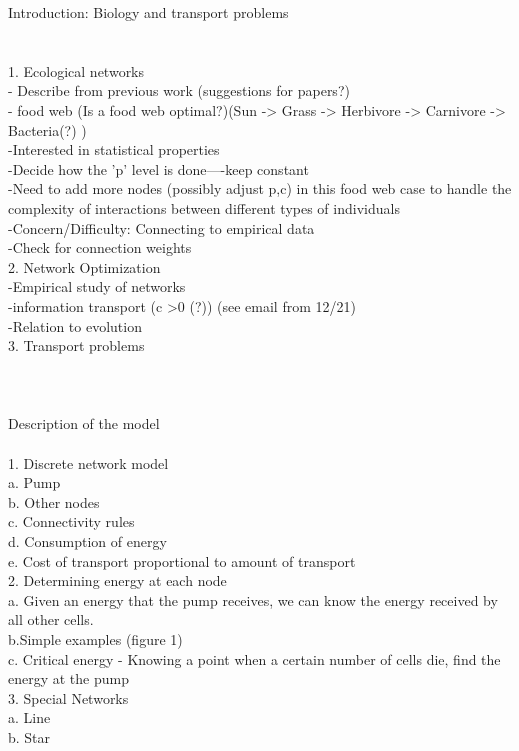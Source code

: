 \documentclass{amsart}
\theoremstyle{plain}
\numberwithin{equation}{section}
\begin{document}
Introduction: Biology and transport problems\\
\\
\\
1. Ecological networks\\
	- Describe from previous work (suggestions for papers?)\\
	- food web (Is a food web optimal?)(Sun -> Grass -> Herbivore -> Carnivore -> Bacteria(?) )\\
		-Interested in statistical properties\\
		-Decide how the 'p' level is done----keep constant\\
		-Need to add more nodes (possibly adjust p,c) in this food web case to handle the complexity of interactions between different types of individuals\\
		-Concern/Difficulty: Connecting to empirical data\\
		-Check for connection weights\\
2. Network Optimization\\
	-Empirical study of networks\\
		-information transport (c >0 (?)) (see email from 12/21)\\
		-Relation to evolution\\
3. Transport problems\\
\\
\\
\\
Description of the model\\
\\
1. Discrete network model\\
 a. Pump\\
 b. Other nodes\\
 c. Connectivity rules\\
 d. Consumption of energy\\
 e. Cost of transport proportional to amount of transport\\
2. Determining energy at each node\\
 a. Given an energy that the pump receives, we can know the energy received by all other cells.\\
 b.Simple examples (figure 1)\\
 c. Critical energy - Knowing a point when a certain number of cells die, find the energy at the pump \\
3. Special Networks\\
 a. Line\\
 b. Star\\
\end{document}
